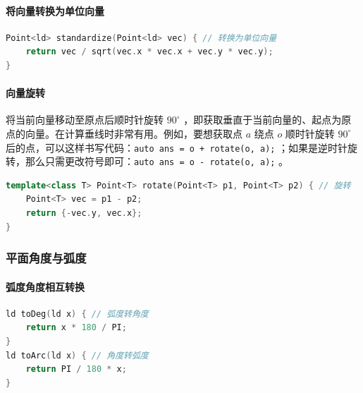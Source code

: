 \hypertarget{ux5c06ux5411ux91cfux8f6cux6362ux4e3aux5355ux4f4dux5411ux91cf}{%
\paragraph{将向量转换为单位向量}\label{ux5c06ux5411ux91cfux8f6cux6362ux4e3aux5355ux4f4dux5411ux91cf}}

\begin{lstlisting}[language={C++}]
Point<ld> standardize(Point<ld> vec) { // 转换为单位向量
    return vec / sqrt(vec.x * vec.x + vec.y * vec.y);
}
\end{lstlisting}

\hypertarget{ux5411ux91cfux65cbux8f6c}{%
\paragraph{向量旋转}\label{ux5411ux91cfux65cbux8f6c}}

将当前向量移动至原点后顺时针旋转 \(90^{\circ}\) ，即获取垂直于当前向量的、起点为原点的向量。在计算垂线时非常有用。例如，要想获取点 \(a\) 绕点 \(o\) 顺时针旋转 \(90^{\circ}\) 后的点，可以这样书写代码：\passthrough{\lstinline!auto ans = o + rotate(o, a);!} ；如果是逆时针旋转，那么只需更改符号即可：\passthrough{\lstinline!auto ans = o - rotate(o, a);!} 。

\begin{lstlisting}[language={C++}]
template<class T> Point<T> rotate(Point<T> p1, Point<T> p2) { // 旋转
    Point<T> vec = p1 - p2;
    return {-vec.y, vec.x};
}
\end{lstlisting}

\hypertarget{ux5e73ux9762ux89d2ux5ea6ux4e0eux5f27ux5ea6}{%
\subsubsection{平面角度与弧度}\label{ux5e73ux9762ux89d2ux5ea6ux4e0eux5f27ux5ea6}}

\hypertarget{ux5f27ux5ea6ux89d2ux5ea6ux76f8ux4e92ux8f6cux6362}{%
\paragraph{弧度角度相互转换}\label{ux5f27ux5ea6ux89d2ux5ea6ux76f8ux4e92ux8f6cux6362}}

\begin{lstlisting}[language={C++}]
ld toDeg(ld x) { // 弧度转角度
    return x * 180 / PI;
}
ld toArc(ld x) { // 角度转弧度
    return PI / 180 * x;
}
\end{lstlisting}

